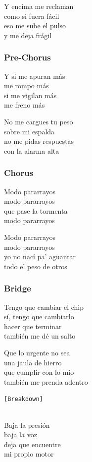 Y encima me reclaman\\
como si fuera fácil\\
eso me sube el pulso\\
y me deja frágil

\subsubsection{Pre-Chorus}\label{pre-chorus-3}

Y si me apuran más\\
me rompo más\\
si me vigilan más\\
me freno más

No me cargues tu peso\\
sobre mi espalda\\
no me pidas respuestas\\
con la alarma alta

\subsubsection{Chorus}\label{chorus-11}

Modo pararrayos\\
modo pararrayos\\
que pase la tormenta\\
modo pararrayos

Modo pararrayos\\
modo pararrayos\\
yo no nací pa' aguantar\\
todo el peso de otros

\subsubsection{Bridge}\label{bridge-3}

Tengo que cambiar el chip\\
sí, tengo que cambiarlo\\
hacer que terminar\\
también me dé un salto

Que lo urgente no sea\\
una jaula de hierro\\
que cumplir con lo mío\\
también me prenda adentro

\texttt{{[}Breakdown{]}}\strut \\
Baja la presión\\
baja la voz\\
deja que encuentre\\
mi propio motor

